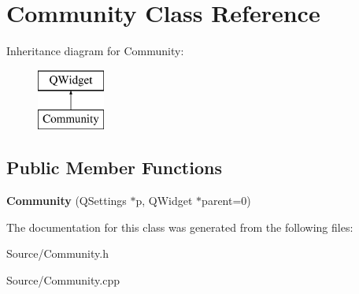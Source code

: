 \hypertarget{class_community}{}\section{Community Class Reference}
\label{class_community}
Inheritance diagram for Community\+:\begin{figure}[H]
\begin{center}
\leavevmode
\includegraphics[height=2.000000cm]{class_community}
\end{center}
\end{figure}
\subsection*{Public Member Functions}
\begin{DoxyCompactItemize}
\item 
\hypertarget{class_community_a6eb9c4baa9ec2cd3867c93e84153ae38}{}{\bfseries Community} (Q\+Settings $\ast$p, Q\+Widget $\ast$parent=0)\label{class_community_a6eb9c4baa9ec2cd3867c93e84153ae38}

\end{DoxyCompactItemize}


The documentation for this class was generated from the following files\+:\begin{DoxyCompactItemize}
\item 
Source/Community.\+h\item 
Source/Community.\+cpp\end{DoxyCompactItemize}
